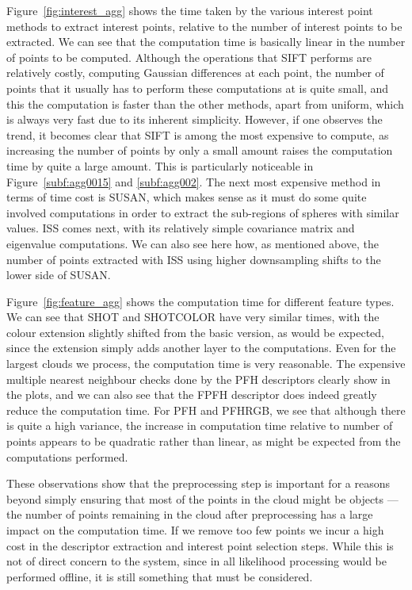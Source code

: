 \documentclass[11pt,a4paper]{kth-mag}
\begin{document}
Figure~\ref{fig:interest_agg} shows the time taken by the various interest point
methods to extract interest points, relative to the number of interest points to
be extracted. We can see that the computation time is basically linear in the
number of points to be computed. Although the operations that SIFT performs are
relatively costly, computing Gaussian differences at each point, the number of
points that it usually has to perform these computations at is quite small, and
this the computation is faster than the other methods, apart from uniform, which
is always very fast due to its inherent simplicity. However, if one observes the
trend, it becomes clear that SIFT is among the most expensive to compute, as
increasing the number of points by only a small amount raises the computation
time by quite a large amount. This is particularly noticeable in
Figure~\ref{subf:agg0015} and \ref{subf:agg002}. The next most expensive method
in terms of time cost is SUSAN, which makes sense as it must do some quite
involved computations in order to extract the sub-regions of spheres with
similar values. ISS comes next, with its relatively simple covariance matrix and
eigenvalue computations. We can also see here how, as mentioned above, the
number of points extracted with ISS using higher downsampling shifts to the
lower side of SUSAN.

Figure~\ref{fig:feature_agg} shows the computation time for different feature
types. We can see that SHOT and SHOTCOLOR have very similar times, with the
colour extension slightly shifted from the basic version, as would be expected,
since the extension simply adds another layer to the computations. Even for the
largest clouds we process, the computation time is very reasonable. The
expensive multiple nearest neighbour checks done by the PFH descriptors clearly
show in the plots, and we can also see that the FPFH descriptor does indeed
greatly reduce the computation time. For PFH and PFHRGB, we see that although
there is quite a high variance, the increase in computation time relative to
number of points appears to be quadratic rather than linear, as might be
expected from the computations performed.

These observations show that the preprocessing step is important for a reasons
beyond simply ensuring that most of the points in the cloud might be objects ---
the number of points remaining in the cloud after preprocessing has a large
impact on the computation time. If we remove too few points we incur a high cost
in the descriptor extraction and interest point selection steps. While this is
not of direct concern to the system, since in all likelihood processing would be
performed offline, it is still something that must be considered.
\end{document}
